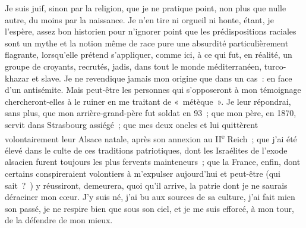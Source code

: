 \documentclass[french,twoside]{book} %
\begin{document}
Je suis juif, sinon par la religion, que je ne pratique point, non plus que nulle autre, du moins par la naissance. Je n’en tire ni orgueil ni honte, étant, je l’espère, assez bon historien pour n’ignorer point que les prédispositions raciales sont un mythe et la notion même de race pure une absurdité particulièrement flagrante, lorsqu’elle prétend s’appliquer, comme ici, à ce qui fut, en réalité, un groupe de croyants, recrutés, jadis, dans tout le monde méditerranéen, turco-khazar et slave. Je ne revendique jamais mon origine que dans un cas : en face d’un antisémite. Mais peut-être les personnes qui s’opposeront à mon témoignage chercheront-elles à le ruiner en me traitant de « métèque ». Je leur répondrai, sans plus, que mon arrière-grand-père fut soldat en 93 ; que mon père, en 1870, servit dans Strasbourg assiégé ; que mes deux oncles et lui quittèrent volontairement leur Alsace natale, après son annexion au II\textsuperscript{e} Reich ; que j’ai été élevé dans le culte de ces traditions patriotiques, dont les Israélites de l’exode alsacien furent toujours les plus fervents mainteneurs ; que la France, enfin, dont certains conspireraient volontiers à m’expulser aujourd’hui et peut-être (qui sait ? ) y réussiront, demeurera, quoi qu’il arrive, la patrie dont je ne saurais déraciner mon cœur. J’y suis né, j’ai bu aux sources de sa culture, j’ai fait mien son passé, je ne respire bien que sous son ciel, et je me suis efforcé, à mon tour, de la défendre de mon mieux.\par
\end{document}
